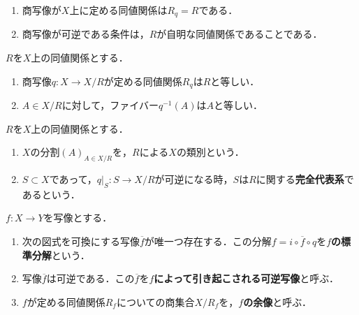 \documentclass[uplatex,dvipdfmx]{jsreport}
\begin{document}
\begin{remark}\mbox{}
    \begin{enumerate}
        \item 商写像が$X$上に定める同値関係は$R_q=R$である．
        \item 商写像が可逆である条件は，$R$が自明な同値関係であることである．
    \end{enumerate}
\end{remark}

\begin{proposition}
    $R$を$X$上の同値関係とする．
    \begin{enumerate}
        \item 商写像$q:X\to X/R$が定める同値関係$R_q$は$R$と等しい．
        \item $A\in X/R$に対して，ファイバー$q^{-1}(A)$は$A$と等しい．
    \end{enumerate}
\end{proposition}

\begin{definition}
    $R$を$X$上の同値関係とする．
    \begin{enumerate}
        \item $X$の分割$(A)_{A\in X/R}$を，$R$による$X$の類別という．
        \item $S\subset X$であって，$q|_S:S\to X/R$が可逆になる時，$S$は$R$に関する\textbf{完全代表系}であるという．
    \end{enumerate}
\end{definition}

\begin{proposition}
    $f:X\to Y$を写像とする．
    \begin{enumerate}
        \item 次の図式を可換にする写像$\overline{f}$が唯一つ存在する．この分解$f=i\circ\overline{f}\circ q$を\textbf{$f$の標準分解}という．\begin{center}\end{center}
        \item 写像$\overline{f}$は可逆である．この$\overline{f}$を\textbf{$f$によって引き起こされる可逆写像}と呼ぶ．
        \item $f$が定める同値関係$R_f$についての商集合$X/R_f$を，\textbf{$f$の余像}と呼ぶ．
    \end{enumerate}
\end{proposition}
\end{document}
